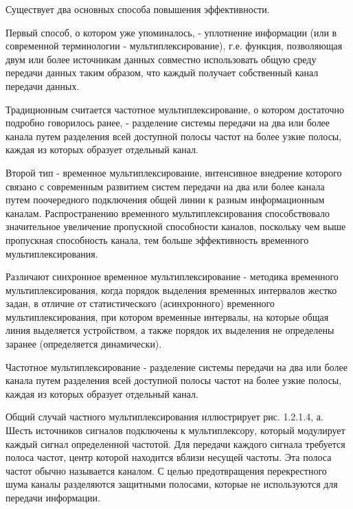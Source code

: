 \documentclass[a4paper]{report}
\begin{document}
Существует два основных способа повышения эффективности.

Первый способ, о котором уже упоминалось, - уплотнение информации (или в современной терминологии - мультиплексирование), г.е. функция, позволяющая двум или более источникам данных совместно использовать общую среду передачи данных таким образом, что каждый получает собственный канал передачи данных.

Традиционным считается частотное мультиплексирование, о котором достаточно подробно говорилось ранее, - разделение системы передачи на два или более канала путем разделения всей доступной полосы частот на более узкие полосы, каждая из которых образует отдельный канал.

Второй тип - временное мультиплексирование, интенсивное внедрение которого связано с современным развитием систем передачи на два или более канала путем поочередного подключения общей линии к разным информационным каналам. Распространению временного мультиплексирования способствовало значительное увеличение пропускной способности каналов, поскольку чем выше пропускная способность канала, тем больше эффективность временного мультиплексирования.

Различают синхронное временное мультиплексирование - методика временного мультиплексирования, когда порядок выделения временных интервалов жестко задан, в отличие от статистического (асинхронного) временного мультиплексирования, при котором временные интервалы, на которые общая линия выделяется устройством, а также порядок их выделения не определены заранее (определяется динамически).

Частотное мультиплексирование - разделение системы передачи на два или более канала путем разделения всей доступной полосы частот на более узкие полосы, каждая из которых образует отдельный канал.

Общий случай частного мультиплексирования иллюстрирует рис. 1.2.1.4, а. Шесть источников сигналов подключены к мультиплексору, который модулирует каждый сигнал определенной частотой. Для передачи каждого сигнала требуется полоса частот, центр которой находится вблизи несущей частоты. Эта полоса частот обычно называется каналом. С целью предотвращения перекрестного шума каналы разделяются защитными полосами, которые не используются для передачи информации.

~
\end{document}
